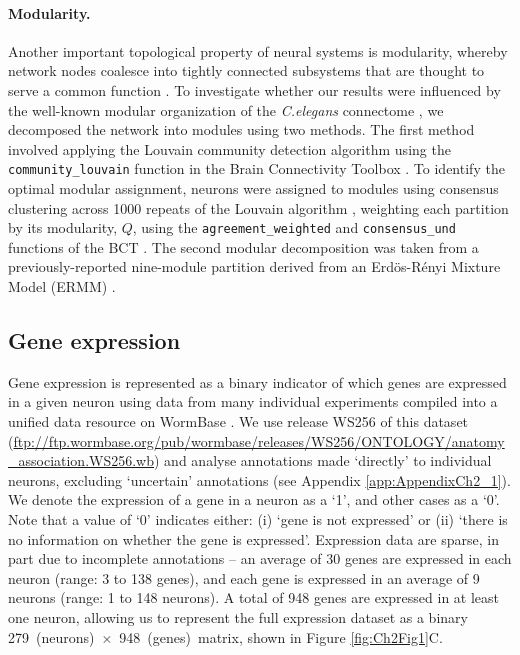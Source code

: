 \paragraph{Modularity.}
Another important topological property of neural systems is modularity, whereby network nodes coalesce into tightly connected subsystems that are thought to serve a common function \citep{Sporns2016}.
To investigate whether our results were influenced by the well-known modular organization of the \emph{C.elegans} connectome \citep{Kim2014a, Pan2010, Bassett2010, Achacoso1992, Pavlovic2014}, we decomposed the network into modules using two methods.
The first method involved applying the Louvain community detection algorithm \citep{Blondel2008} using the \texttt{community\_louvain} function in the Brain Connectivity Toolbox \citep{Rubinov2010}.
To identify the optimal modular assignment, neurons were assigned to modules using consensus clustering across 1000 repeats of the Louvain algorithm \citep{Lancichinetti2012}, weighting each partition by its modularity, $Q$, using the \texttt{agreement\_weighted} and \texttt{consensus\_und} functions of the BCT \citep{Rubinov2010}.
The second modular decomposition was taken from a previously-reported nine-module partition derived from an Erd\"os-R\'enyi Mixture Model (ERMM) \citep{Pavlovic2014}.

\subsection*{Gene expression}
Gene expression is represented as a binary indicator of which genes are expressed in a given neuron using data from many individual experiments compiled into a unified data resource on WormBase \citep{Harris2010}.
We use release WS256 of this dataset (\url{ftp://ftp.wormbase.org/pub/wormbase/releases/WS256/ONTOLOGY/anatomy_association.WS256.wb}) and analyse annotations made `directly' to individual neurons, excluding `uncertain' annotations (see Appendix \ref{app:AppendixCh2_1}).
We denote the expression of a gene in a neuron as a `1', and other cases as a `0'.
Note that a value of `0' indicates either:
(i) `gene is not expressed' or
(ii) `there is no information on whether the gene is expressed'.
Expression data are sparse, in part due to incomplete annotations -- an average of 30 genes are expressed in each neuron (range: 3 to 138 genes), and each gene is expressed in an average of 9 neurons (range: 1 to 148 neurons).
A total of 948 genes are expressed in at least one neuron, allowing us to represent the full expression dataset as a binary \mbox{279 (neurons) $\times$ 948 (genes) matrix}, shown in Figure \ref{fig:Ch2Fig1}C.

